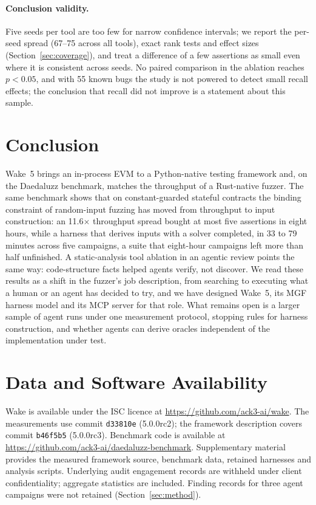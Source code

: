 \documentclass[11pt,a4paper]{article}
\newcommand{\wake}{Wake}
\begin{document}
\paragraph{Conclusion validity.}
Five seeds per tool are too few for narrow confidence intervals; we report the per-seed spread (67--75 across all tools), exact rank tests and effect sizes (Section~\ref{sec:coverage}), and treat a difference of a few assertions as small even where it is consistent across seeds. No paired comparison in the ablation reaches $p<0.05$, and with 55 known bugs the study is not powered to detect small recall effects; the conclusion that recall did not improve is a statement about this sample.

\section{Conclusion}
\label{sec:conclusion}

\wake{}~5 brings an in-process EVM to a Python-native testing framework and, on the Daedaluzz benchmark, matches the throughput of a Rust-native fuzzer. The same benchmark shows that on constant-guarded stateful contracts the binding constraint of random-input fuzzing has moved from throughput to input construction: an 11.6$\times$ throughput spread bought at most five assertions in eight hours, while a harness that derives inputs with a solver completed, in 33 to 79 minutes across five campaigns, a suite that eight-hour campaigns left more than half unfinished. A static-analysis tool ablation in an agentic review points the same way: code-structure facts helped agents verify, not discover. We read these results as a shift in the fuzzer's job description, from searching to executing what a human or an agent has decided to try, and we have designed \wake{}~5, its MGF harness model and its MCP server for that role. What remains open is a larger sample of agent runs under one measurement protocol, stopping rules for harness construction, and whether agents can derive oracles independent of the implementation under test.

\section*{Data and Software Availability}
\label{sec:availability}

\wake{} is available under the ISC licence at \mbox{\url{https://github.com/ack3-ai/wake}}. The measurements use commit \texttt{d33810e} (5.0.0rc2); the framework description covers commit \texttt{b46f5b5} (5.0.0rc3). Benchmark code is available at \url{https://github.com/ack3-ai/daedaluzz-benchmark}. Supplementary material provides the measured framework source, benchmark data, retained harnesses and analysis scripts. Underlying audit engagement records are withheld under client confidentiality; aggregate statistics are included. Finding records for three agent campaigns were not retained (Section~\ref{sec:method}).
\end{document}
